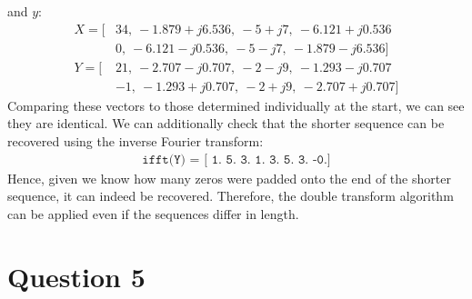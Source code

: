 \documentclass[a4paper, 11pt]{article}
\begin{document}
\begin{enumerate}[label=\alph*)]
    and $y$:
    \begin{align*}
        X = [&34,\ -1.879+j6.536,\ -5+j7,\ -6.121+j0.536 \\
             &0,\ -6.121-j0.536,\ -5-j7,\ -1.879-j6.536] \\
        Y = [&21,\ -2.707-j0.707,\ -2-j9,\ -1.293-j0.707 \\
             &-1,\ -1.293+j0.707,\ -2+j9,\ -2.707+j0.707]
    \end{align*}
    Comparing these vectors to those determined individually at the start, we
    can see they are identical. We can additionally check that the shorter
    sequence can be recovered using the inverse Fourier transform:
    \begin{align*}
        \texttt{ifft(Y) = [ 1.  5.  3.  1.  3.  5.  3. -0.]}
    \end{align*}
    Hence, given we know how many zeros were padded onto the end of the shorter
    sequence, it can indeed be recovered. Therefore, the double transform
    algorithm can be applied even if the sequences differ in length.

\end{enumerate}

\newpage
\section*{Question 5}
\end{document}
